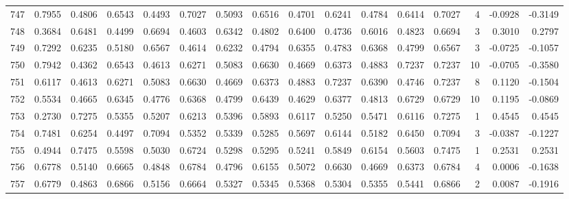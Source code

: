 \begin{tabular}{lrrrrrrrrrrrrrrr}
747 &      0.7955 &  0.4806 &  0.6543 &  0.4493 &  0.7027 &  0.5093 &  0.6516 &  0.4701 &  0.6241 &  0.4784 &   0.6414 &     0.7027 &      4 &                   -0.0928 &                    -0.3149 \\
748 &      0.3684 &  0.6481 &  0.4499 &  0.6694 &  0.4603 &  0.6342 &  0.4802 &  0.6400 &  0.4736 &  0.6016 &   0.4823 &     0.6694 &      3 &                    0.3010 &                     0.2797 \\
749 &      0.7292 &  0.6235 &  0.5180 &  0.6567 &  0.4614 &  0.6232 &  0.4794 &  0.6355 &  0.4783 &  0.6368 &   0.4799 &     0.6567 &      3 &                   -0.0725 &                    -0.1057 \\
750 &      0.7942 &  0.4362 &  0.6543 &  0.4613 &  0.6271 &  0.5083 &  0.6630 &  0.4669 &  0.6373 &  0.4883 &   0.7237 &     0.7237 &     10 &                   -0.0705 &                    -0.3580 \\
751 &      0.6117 &  0.4613 &  0.6271 &  0.5083 &  0.6630 &  0.4669 &  0.6373 &  0.4883 &  0.7237 &  0.6390 &   0.4746 &     0.7237 &      8 &                    0.1120 &                    -0.1504 \\
752 &      0.5534 &  0.4665 &  0.6345 &  0.4776 &  0.6368 &  0.4799 &  0.6439 &  0.4629 &  0.6377 &  0.4813 &   0.6729 &     0.6729 &     10 &                    0.1195 &                    -0.0869 \\
753 &      0.2730 &  0.7275 &  0.5355 &  0.5207 &  0.6213 &  0.5396 &  0.5893 &  0.6117 &  0.5250 &  0.5471 &   0.6116 &     0.7275 &      1 &                    0.4545 &                     0.4545 \\
754 &      0.7481 &  0.6254 &  0.4497 &  0.7094 &  0.5352 &  0.5339 &  0.5285 &  0.5697 &  0.6144 &  0.5182 &   0.6450 &     0.7094 &      3 &                   -0.0387 &                    -0.1227 \\
755 &      0.4944 &  0.7475 &  0.5598 &  0.5030 &  0.6724 &  0.5298 &  0.5295 &  0.5241 &  0.5849 &  0.6154 &   0.5603 &     0.7475 &      1 &                    0.2531 &                     0.2531 \\
756 &      0.6778 &  0.5140 &  0.6665 &  0.4848 &  0.6784 &  0.4796 &  0.6155 &  0.5072 &  0.6630 &  0.4669 &   0.6373 &     0.6784 &      4 &                    0.0006 &                    -0.1638 \\
757 &      0.6779 &  0.4863 &  0.6866 &  0.5156 &  0.6664 &  0.5327 &  0.5345 &  0.5368 &  0.5304 &  0.5355 &   0.5441 &     0.6866 &      2 &                    0.0087 &                    -0.1916 \\

\end{tabular}

